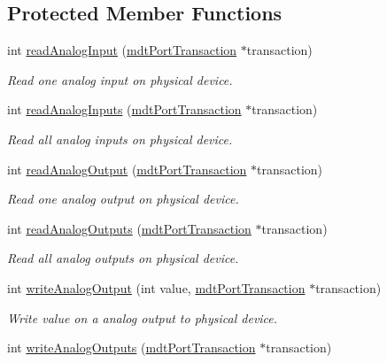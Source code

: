 \subsection*{Protected Member Functions}
\begin{DoxyCompactItemize}
\item 
int \hyperlink{classmdt_device_modbus_aa2a024793ae2a5e81c7e92260a70cd9e}{readAnalogInput} (\hyperlink{classmdt_port_transaction}{mdtPortTransaction} $\ast$transaction)
\begin{DoxyCompactList}\small\item\em Read one analog input on physical device. \end{DoxyCompactList}\item 
int \hyperlink{classmdt_device_modbus_a846af6dbf80bbf747f3f966420ef6f92}{readAnalogInputs} (\hyperlink{classmdt_port_transaction}{mdtPortTransaction} $\ast$transaction)
\begin{DoxyCompactList}\small\item\em Read all analog inputs on physical device. \end{DoxyCompactList}\item 
int \hyperlink{classmdt_device_modbus_a30c815cbe5e603e8114dcbc09849e322}{readAnalogOutput} (\hyperlink{classmdt_port_transaction}{mdtPortTransaction} $\ast$transaction)
\begin{DoxyCompactList}\small\item\em Read one analog output on physical device. \end{DoxyCompactList}\item 
int \hyperlink{classmdt_device_modbus_ae02dd44f1d873fcc15ff75d781b62b0b}{readAnalogOutputs} (\hyperlink{classmdt_port_transaction}{mdtPortTransaction} $\ast$transaction)
\begin{DoxyCompactList}\small\item\em Read all analog outputs on physical device. \end{DoxyCompactList}\item 
int \hyperlink{classmdt_device_modbus_ac63297a31205759622f341525c34251f}{writeAnalogOutput} (int value, \hyperlink{classmdt_port_transaction}{mdtPortTransaction} $\ast$transaction)
\begin{DoxyCompactList}\small\item\em Write value on a analog output to physical device. \end{DoxyCompactList}\item 
int \hyperlink{classmdt_device_modbus_a87af02c83cede03d6ee988c678e0fc00}{writeAnalogOutputs} (\hyperlink{classmdt_port_transaction}{mdtPortTransaction} $\ast$transaction)

\end{DoxyCompactItemize}
